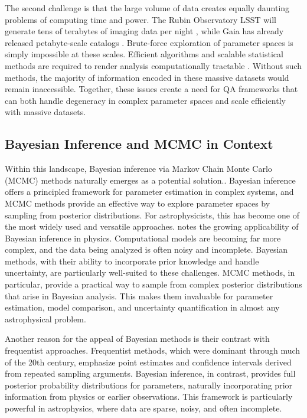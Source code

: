 \documentclass[preprint,longauthor]{aastex631}
\numberwithin{equation}{section}
\begin{document}
The second challenge is that the large volume of data creates equally daunting problems of computing time and power. The Rubin Observatory LSST will generate tens of terabytes of imaging data per night \citep{borneAstroinformatics21stCentury2009}, while Gaia has already released petabyte-scale catalogs \citep{gaiacollaborationGaiaDataRelease2023}. Brute-force exploration of parameter spaces is simply impossible at these scales. Efficient algorithms and scalable statistical methods are required to render analysis computationally tractable \citep{huijseComputationalIntelligenceChallenges2014}. Without such methods, the majority of information encoded in these massive datasets would remain inaccessible. Together, these issues create a need for QA frameworks that can both handle degeneracy in complex parameter spaces and scale efficiently with massive datasets.

\subsection{Bayesian Inference and MCMC in Context}

Within this landscape, Bayesian inference via Markov Chain Monte Carlo (MCMC) methods naturally emerges as a potential solution.. Bayesian inference offers a principled framework for parameter estimation in complex systems, and MCMC methods provide an effective way to explore parameter spaces by sampling from posterior distributions. For astrophysicists, this has become one of the most widely used and versatile approaches. \citet{vontoussaintBayesianInferencePhysics2011} notes the growing applicability of Bayesian inference in physics. Computational models are becoming far more complex, and the data being analyzed is often noisy and incomplete. Bayesian methods, with their ability to incorporate prior knowledge and handle uncertainty, are particularly well-suited to these challenges. MCMC methods, in particular, provide a practical way to sample from complex posterior distributions that arise in Bayesian analysis. This makes them invaluable for parameter estimation, model comparison, and uncertainty quantification in almost any astrophysical problem.

Another reason for the appeal of Bayesian methods is their contrast with frequentist approaches. Frequentist methods, which were dominant through much of the 20th century, emphasize point estimates and confidence intervals derived from repeated sampling arguments. Bayesian inference, in contrast, provides full posterior probability distributions for parameters, naturally incorporating prior information from physics or earlier observations. This framework is particularly powerful in astrophysics, where data are sparse, noisy, and often incomplete.
\end{document}
